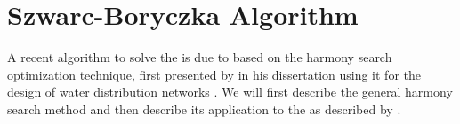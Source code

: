 \section{Szwarc-Boryczka Algorithm}
\label{sec:04:szwarc}

A recent algorithm to solve the \op{} is due to \citeauthor{szwarc_novel_2022} \cite{szwarc_novel_2022} based on the harmony search optimization technique, 
first presented by \citeauthor{geem_optimal_2000} in his dissertation using it for the design of water distribution networks \cite{geem_optimal_2000}.
We will first describe the general harmony search method and then describe its application to the \op{} as described by \citeauthor{szwarc_novel_2022}.




